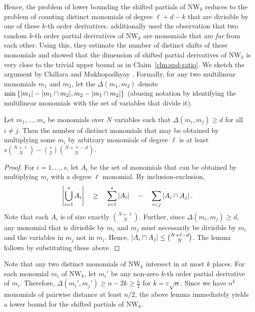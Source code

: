 \documentclass[12pt]{report}
\renewcommand{\epsilon}{\varepsilon}
\begin{document}
Hence, the problem of lower bounding the shifted partials of $\mathrm{NW}_k$ reduces to the problem of counting distinct monomials of degree $\ell + d-k$ that are divisible by one of these $k$-th order derivatives. \cite{KSS13} additionally used the observation that two random $k$-th order partial derivatives of $\mathrm{NW}_k$ are monomials that are \emph{far} from each other. Using this, they estimate the number of distinct shifts of these monomials and showed that the dimension of shifted partial derivatives of $\mathrm{NW}_k$ is very close to the trivial upper bound as in Claim~\ref{clm:spd-ratio}. We sketch the argument by Chillara and Mukhopadhyay \cite{cm14}. Formally, for any two multilinear monomials $m_1$ and $m_2$, let the $\Delta(m_1,m_2)$ denote $\min\left\{|m_1| - |m_1\cap m_2|, m_2 - |m_1 \cap m_2|\right\}$ (abusing notation by identifying the multilinear monomials with the set of variables that divide it). 

\begin{lemma}[\cite{cm14}]\label{lem:cm-inc-exc}
Let $m_1,\dots, m_s$ be monomials over $N$ variables such that $\Delta(m_i, m_j) \geq d$ for all $i\neq j$. Then the number of distinct monomials that may be obtained by multiplying some $m_i$ by arbitrary monomials of degree $\ell$ is at least $s \binom{N+\ell}{N} - \binom{s}{2} \binom{N+\ell - d}{N}$. 
\end{lemma}
\begin{proof}
For $i = 1,\dots, s$, let $A_i$ be the set of monomials that can be obtained by multiplying $m_i$ with a degree $\ell$ monomial. By inclusion-exclusion, 
$$
\left|\bigcup_{i=1}^s A_i\right| \quad \geq \quad \sum_{i=1}^s \left|A_i\right| \quad - \quad \sum_{i<j} \left|A_i \cap A_j\right|.
$$
Note that each $A_i$ is of size exactly $\binom{N+\ell}{N}$. Further, since $\Delta(m_i, m_j) \geq d$, any monomial that is divisible by $m_i$ and $m_j$ must necessarily be divisible by $m_i$ and the variables in $m_j$ not in $m_i$. Hence, $\left|A_i\cap A_j\right| \leq \binom{N + \ell - d}{N}$. The lemma follows by substituting these above. 
\end{proof}

Note that any two distinct monomials of $\mathrm{NW}_k$ intersect in at most $k$ places. For each monomial $m_i$ of $\mathrm{NW}_k$, let $m_i'$ be any non-zero $k$-th order partial derivative of $m_i$. Therefore, $\Delta(m_i', m_j') \geq n -2k \geq \frac{n}{2}$ for $k = \epsilon \sqrt{n}$. Since we have $n^k$ monomials of pairwise distance at least $n/2$, the above lemma immediately yields a lower bound for the shifted partials of $\mathrm{NW}_k$. 
\end{document}
